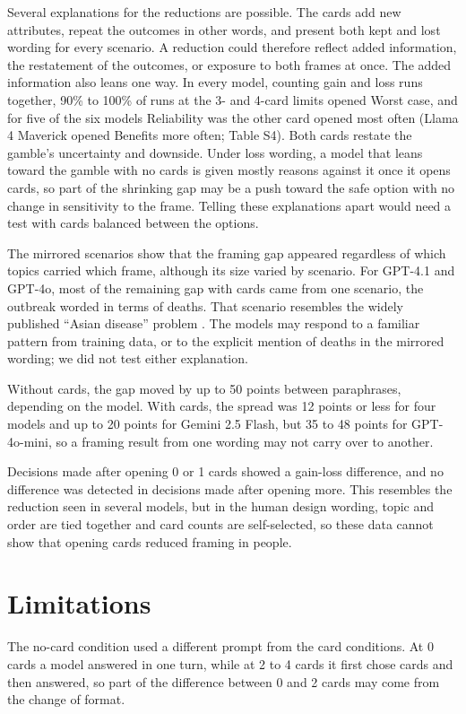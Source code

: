 \documentclass[11pt]{article}
\begin{document}
Several explanations for the reductions are possible. The cards add new attributes, repeat the outcomes in other words, and present both kept and lost wording for every scenario. A reduction could therefore reflect added information, the restatement of the outcomes, or exposure to both frames at once. The added information also leans one way. In every model, counting gain and loss runs together, 90\% to 100\% of runs at the 3- and 4-card limits opened Worst case, and for five of the six models Reliability was the other card opened most often (Llama 4 Maverick opened Benefits more often; Table S4). Both cards restate the gamble's uncertainty and downside. Under loss wording, a model that leans toward the gamble with no cards is given mostly reasons against it once it opens cards, so part of the shrinking gap may be a push toward the safe option with no change in sensitivity to the frame. Telling these explanations apart would need a test with cards balanced between the options.

The mirrored scenarios show that the framing gap appeared regardless of which topics carried which frame, although its size varied by scenario. For GPT-4.1 and GPT-4o, most of the remaining gap with cards came from one scenario, the outbreak worded in terms of deaths. That scenario resembles the widely published ``Asian disease'' problem \citep{tversky1981framing}. The models may respond to a familiar pattern from training data, or to the explicit mention of deaths in the mirrored wording; we did not test either explanation.

Without cards, the gap moved by up to 50 points between paraphrases, depending on the model. With cards, the spread was 12 points or less for four models and up to 20 points for Gemini 2.5 Flash, but 35 to 48 points for GPT-4o-mini, so a framing result from one wording may not carry over to another.

Decisions made after opening 0 or 1 cards showed a gain-loss difference, and no difference was detected in decisions made after opening more. This resembles the reduction seen in several models, but in the human design wording, topic and order are tied together and card counts are self-selected, so these data cannot show that opening cards reduced framing in people.

\section{Limitations}

The no-card condition used a different prompt from the card conditions. At 0 cards a model answered in one turn, while at 2 to 4 cards it first chose cards and then answered, so part of the difference between 0 and 2 cards may come from the change of format.
\end{document}
